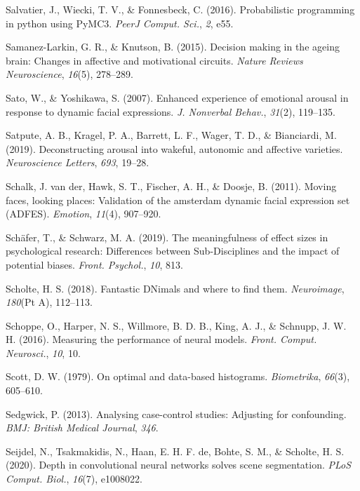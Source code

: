 \documentclass[11pt,american,]{memoir} %
\begin{document}
\leavevmode\hypertarget{ref-Salvatier2016-ko}{}%
Salvatier, J., Wiecki, T. V., \& Fonnesbeck, C. (2016). Probabilistic programming in python using PyMC3. \emph{PeerJ Comput. Sci.}, \emph{2}, e55.

\leavevmode\hypertarget{ref-samanez2015decision}{}%
Samanez-Larkin, G. R., \& Knutson, B. (2015). Decision making in the ageing brain: Changes in affective and motivational circuits. \emph{Nature Reviews Neuroscience}, \emph{16}(5), 278--289.

\leavevmode\hypertarget{ref-Sato2007-ah}{}%
Sato, W., \& Yoshikawa, S. (2007). Enhanced experience of emotional arousal in response to dynamic facial expressions. \emph{J. Nonverbal Behav.}, \emph{31}(2), 119--135.

\leavevmode\hypertarget{ref-satpute2019deconstructing}{}%
Satpute, A. B., Kragel, P. A., Barrett, L. F., Wager, T. D., \& Bianciardi, M. (2019). Deconstructing arousal into wakeful, autonomic and affective varieties. \emph{Neuroscience Letters}, \emph{693}, 19--28.

\leavevmode\hypertarget{ref-Van_der_Schalk2011-bq}{}%
Schalk, J. van der, Hawk, S. T., Fischer, A. H., \& Doosje, B. (2011). Moving faces, looking places: Validation of the amsterdam dynamic facial expression set (ADFES). \emph{Emotion}, \emph{11}(4), 907--920.

\leavevmode\hypertarget{ref-Schafer2019-ue}{}%
Schäfer, T., \& Schwarz, M. A. (2019). The meaningfulness of effect sizes in psychological research: Differences between Sub-Disciplines and the impact of potential biases. \emph{Front. Psychol.}, \emph{10}, 813.

\leavevmode\hypertarget{ref-Scholte2018-he}{}%
Scholte, H. S. (2018). Fantastic DNimals and where to find them. \emph{Neuroimage}, \emph{180}(Pt A), 112--113.

\leavevmode\hypertarget{ref-Schoppe2016-bu}{}%
Schoppe, O., Harper, N. S., Willmore, B. D. B., King, A. J., \& Schnupp, J. W. H. (2016). Measuring the performance of neural models. \emph{Front. Comput. Neurosci.}, \emph{10}, 10.

\leavevmode\hypertarget{ref-scott1979optimal}{}%
Scott, D. W. (1979). On optimal and data-based histograms. \emph{Biometrika}, \emph{66}(3), 605--610.

\leavevmode\hypertarget{ref-Sedgwick2013-op}{}%
Sedgwick, P. (2013). Analysing case-control studies: Adjusting for confounding. \emph{BMJ: British Medical Journal}, \emph{346}.

\leavevmode\hypertarget{ref-Seijdel2020-ff}{}%
Seijdel, N., Tsakmakidis, N., Haan, E. H. F. de, Bohte, S. M., \& Scholte, H. S. (2020). Depth in convolutional neural networks solves scene segmentation. \emph{PLoS Comput. Biol.}, \emph{16}(7), e1008022.
\end{document}
